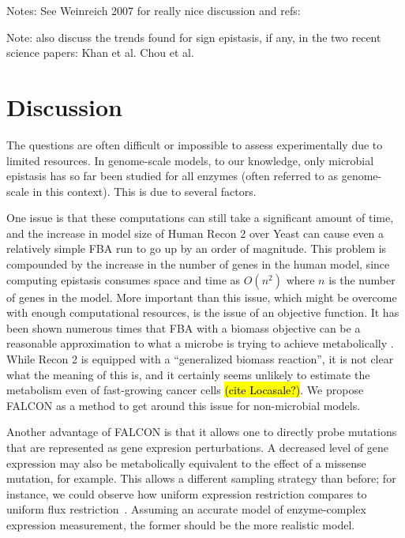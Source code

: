 Notes: See Weinreich 2007 for really nice discussion and refs:

Note: also discuss the trends found for sign epistasis, if any, in the two recent science papers:
Khan et al.
Chou et al.

\section{Discussion}

The questions are often
difficult or impossible to assess experimentally due to limited
resources.  In genome-scale models, to our knowledge, only microbial
epistasis has so far been studied for all enzymes (often referred to
as genome-scale in this context). This is due to several factors.

One issue is that these computations can still take a significant
amount of time, and the increase in model size of Human Recon 2 over
Yeast can cause even a relatively simple FBA run to go up by an order
of magnitude.  This problem is compounded by the increase in the
number of genes in the human model, since computing epistasis consumes
space and time as $O(n^2)$ where $n$ is the number of genes in the
model. More important than this issue, which might be overcome with
enough computational resources, is the issue of an objective
function. It has been shown numerous times that FBA with a biomass
objective can be a reasonable approximation to what a microbe is
trying to achieve metabolically
\citep{Schuetz2012, Fong2004, Varma1994}. While Recon 2
is equipped with a ``generalized biomass reaction'', it is not clear
what the meaning of this is, and it certainly seems unlikely to
estimate the metabolism even of fast-growing cancer cells \hl{(cite
  Locasale?)}. We propose FALCON as a method to get around this issue
for non-microbial models.

Another advantage of FALCON is that it allows one to directly probe
mutations that are represented as gene expresion perturbations. A
decreased level of gene expression may also be metabolically
equivalent to the effect of a missense mutation, for example. This
allows a different sampling strategy than before; for instance, we
could observe how uniform expression restriction compares to uniform
flux restriction~\citep{Xu2012}. Assuming an accurate model of
enzyme-complex expression measurement, the former should be the more
realistic model.

